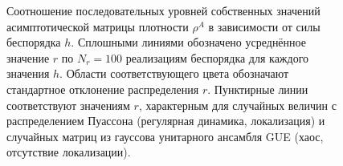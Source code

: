 \begin{figure}[h]
	\caption[Соотношение последовательных уровней для асимптотической матрицы плотности в зависимости от силы беспорядка в системе]{
		Соотношение последовательных уровней собственных значений асимптотической матрицы плотности \(\rho^A\) в зависимости от силы беспорядка \(h\). Сплошными линиями обозначено усреднённое значение \(r\) по \(N_r=100\) реализациям беспорядка для каждого значения \(h\). Области соответствующего цвета обозначают стандартное отклонение распределения \(r\). Пунктирные линии соответствуют значениям \(r\), характерным для случайных величин с распределением Пуассона (регулярная динамика, локализация) и случайных матриц из гауссова унитарного ансамбля GUE (хаос, отсутствие локализации).
	}
	\label{fig:mbl_ratio}
\end{figure}

